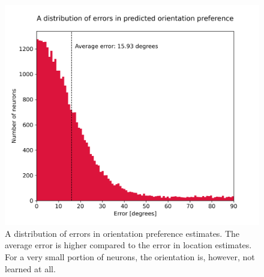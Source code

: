 \begin{figure}[H]\centering
	\includegraphics[width=150mm]{../img/distribution_of_orientation_errors.png}
	\caption{A distribution of errors in orientation preference estimates. The average error is higher compared to the error in location estimates. For a very small portion of neurons, the orientation is, however, not learned at all.}
	\label{err_ori}
\end{figure}

























